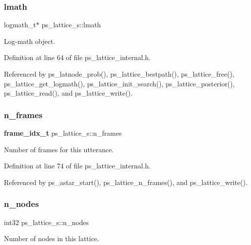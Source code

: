 \subsubsection{lmath}
{\footnotesize\ttfamily logmath\+\_\+t$\ast$ ps\+\_\+lattice\+\_\+s\+::lmath}



Log-\/math object. 



Definition at line 64 of file ps\+\_\+lattice\+\_\+internal.\+h.



Referenced by ps\+\_\+latnode\+\_\+prob(), ps\+\_\+lattice\+\_\+bestpath(), ps\+\_\+lattice\+\_\+free(), ps\+\_\+lattice\+\_\+get\+\_\+logmath(), ps\+\_\+lattice\+\_\+init\+\_\+search(), ps\+\_\+lattice\+\_\+posterior(), ps\+\_\+lattice\+\_\+read(), and ps\+\_\+lattice\+\_\+write().

\mbox{\label{structps__lattice__s_a3a997dc60d28b84d5bfc01f9ce25a891}} 
\subsubsection{n\+\_\+frames}
{\footnotesize\ttfamily \textbf{ frame\+\_\+idx\+\_\+t} ps\+\_\+lattice\+\_\+s\+::n\+\_\+frames}



Number of frames for this utterance. 



Definition at line 74 of file ps\+\_\+lattice\+\_\+internal.\+h.



Referenced by ps\+\_\+astar\+\_\+start(), ps\+\_\+lattice\+\_\+n\+\_\+frames(), and ps\+\_\+lattice\+\_\+write().

\mbox{\label{structps__lattice__s_adcc3bdadae1f3e3ace2d36548983ae78}} 
\subsubsection{n\+\_\+nodes}
{\footnotesize\ttfamily int32 ps\+\_\+lattice\+\_\+s\+::n\+\_\+nodes}



Number of nodes in this lattice. 



